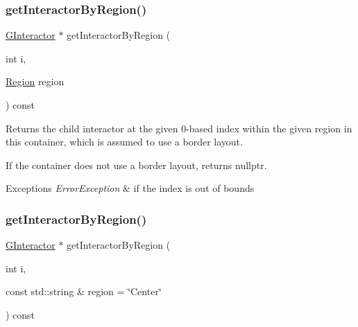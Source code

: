 \subsubsection{\texorpdfstring{get\+Interactor\+By\+Region()}{getInteractorByRegion()}\hspace{0.1cm}{\footnotesize\ttfamily [1/2]}}
{\footnotesize\ttfamily \mbox{\hyperlink{classGInteractor}{G\+Interactor}} $\ast$ get\+Interactor\+By\+Region (\begin{DoxyParamCaption}\item[{int}]{i,  }\item[{\mbox{\hyperlink{classGContainer_a81a01a86de31071a92e6cce0bab9bc4b}{Region}}}]{region }\end{DoxyParamCaption}) const\hspace{0.3cm}{\ttfamily [virtual]}}



Returns the child interactor at the given 0-\/based index within the given region in this container, which is assumed to use a border layout. 

If the container does not use a border layout, returns nullptr. 
\begin{DoxyExceptions}{Exceptions}
{\em Error\+Exception} & if the index is out of bounds \\
\hline
\end{DoxyExceptions}
\mbox{\label{classGContainer_a576bbbb845c9bcf139fca956e3a4c757}} 
\subsubsection{\texorpdfstring{get\+Interactor\+By\+Region()}{getInteractorByRegion()}\hspace{0.1cm}{\footnotesize\ttfamily [2/2]}}
{\footnotesize\ttfamily \mbox{\hyperlink{classGInteractor}{G\+Interactor}} $\ast$ get\+Interactor\+By\+Region (\begin{DoxyParamCaption}\item[{int}]{i,  }\item[{const std\+::string \&}]{region = {\ttfamily \char`\"{}Center\char`\"{}} }\end{DoxyParamCaption}) const\hspace{0.3cm}{\ttfamily [virtual]}}



